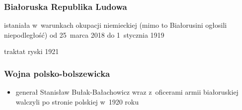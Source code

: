 \subsubsection*{Białoruska Republika Ludowa}
\begin{description}
    \item istaniała w~warunkach okupacji niemieckiej (mimo to Białorusini ogłosili niepodległość) od 25~marca 2018 do 1~stycznia 1919
    \item traktat ryski 1921
\end{description}
\subsubsection*{Wojna polsko-bolszewicka}
\begin{itemize}
    \item generał Stanisław Bułak-Bałachowicz wraz z~oficerami armii białoruskiej walczyli po stronie polskiej w~1920 roku
\end{itemize}
